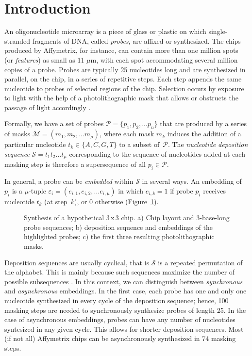\documentclass{bioinfo}
\begin{document}
\section{Introduction}

An oligonucleotide microarray is a piece of glass or plastic on which single-stranded fragments of DNA, called \emph{probes}, are affixed or synthesized. The chips produced by Affymetrix, for instance, can contain more than one million spots (or \emph{features}) as small as 11 $\mu$m, with each spot accommodating several million copies of a probe. Probes are typically 25 nucleotides long and are synthesized in parallel, on the chip, in a series of repetitive steps. Each step appends the same nucleotide to probes of selected regions of the chip. Selection occurs by exposure to light with the help of a photolithographic mask that allows or obstructs the passage of light accordingly \citep{FODOR91}.

Formally, we have a set of probes $\mathcal{P} = \{p_{1}, p_{2}, ... p_{n}\}$ that are produced by a series of masks $\mathcal{M} = (m_{1}, m_{2}, ... m_{\mu})$, where each mask $m_{k}$ induces the addition of a particular nucleotide $t_{k} \in \{A, C, G, T\}$ to a subset of~$\mathcal{P}$. The \emph{nucleotide deposition sequence} $\mathcal{S} = t_{1} t_{2} \ldots t_{\mu}$ corresponding to the sequence of nucleotides added at each masking step is therefore a supersequence of all $p_{i} \in \mathcal{P}$.

In general, a probe can be \emph{embedded} within $\mathcal{S}$ in several ways. An embedding of $p_{i}$ is a $\mu$-tuple $\varepsilon_{i} = (e_{i,1}, e_{i,2}, ... e_{i,\mu})$ in which $e_{i,k} = 1$ if probe $p_{i}$ receives nucleotide $t_{k}$ (at step~$k$), or 0 otherwise (Figure~\ref{fig:masking_process}).

\begin{figure}
\caption{Synthesis of a hypothetical 3\,x\,3 chip. a) Chip layout and 3-base-long probe sequences; b) deposition sequence and embeddings of the highlighted probes; c) the first three resulting photolithographic masks.}
\label{fig:masking_process}
\end{figure}

Deposition sequences are usually cyclical, that is $\mathcal{S}$ is a repeated permutation of the alphabet. This is mainly because such sequences maximize the number of possible subsequences \citep{CHASE76}. In this context, we can distinguish between \emph{synchronous} and \emph{asynchronous} embeddings. In the first case, each probe has one and only one nucleotide synthesized in every cycle of the deposition sequence; hence, 100 masking steps are needed to synchronously synthesize probes of length 25. In the case of asynchronous embeddings, probes can have any number of nucleotides syntesized in any given cycle. This allows for shorter deposition sequences. Most (if not all) Affymetrix chips can be asynchronously synthesized in 74 masking steps.
\end{document}
